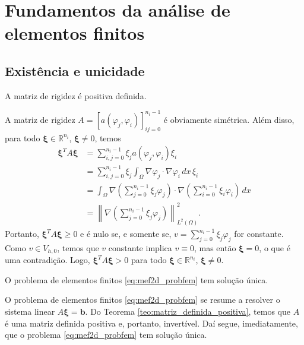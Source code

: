 \section{Fundamentos da análise de elementos finitos}\label{cap_mef2d_sec_funanlef}
\badgeRevisar

\subsection{Existência e unicidade}
\badgeRevisar

\begin{teo}\label{teo:matriz_definida_positiva}
  A matriz de rigidez é positiva definida.
\end{teo}
\begin{dem}
  A matriz de rigidez $A = [a(\varphi_j,\varphi_i)]_{ij=0}^{n_i-1}$ é obviamente simétrica. Além disso, para todo $\pmb{\xi}\in\mathbb{R}^{n_i}$, $\pmb{\xi}\neq 0$, temos
  \begin{align}
    \pmb{\xi}^TA\pmb{\xi} &= \sum_{i,j=0}^{n_i-1} \xi_ja(\varphi_j,\varphi_i)\xi_i\\
    &= \sum_{i,j=0}^{n_i-1}\xi_j\int_\Omega \nabla \varphi_j\cdot\nabla\varphi_i\,dx\,\xi_i\\
    &= \int_\Omega \nabla \left(\sum_{j=0}^{n_i-1}\xi_j\varphi_j\right)\cdot\nabla \left(\sum_{i=0}^{n_i-1}\xi_i\varphi_i\right)\,dx\\
    &= \left\|\nabla \left(\sum_{j=0}^{n_i-1}\xi_j\varphi_j\right) \right\|_{L^2(\Omega)}^2.
  \end{align}
  Portanto, $\pmb{\xi}^TA\pmb{\xi} \geq 0$ e é nulo se, e somente se, $v = \sum_{j=0}^{n_i-1}\xi_j\varphi_j$ for constante. Como $v\in V_{h,0}$, temos que $v$ constante implica $v\equiv 0$, mas então $\pmb{\xi}=0$, o que é uma contradição. Logo, $\pmb{\xi}^TA\pmb{\xi} > 0$ para todo $\pmb{\xi}\in\mathbb{R}^{n_i}$, $\pmb{\xi}\neq 0$.
\end{dem}

\begin{teo}
  O problema de elementos finitos \eqref{eq:mef2d_probfem} tem solução única.
\end{teo}
\begin{dem}
  O problema de elementos finitos \eqref{eq:mef2d_probfem} se resume a resolver o sistema linear $A\pmb{\xi} = \pmb{b}$. Do Teorema \ref{teo:matriz_definida_positiva}, temos que $A$ é uma matriz definida positiva e, portanto, invertível. Daí segue, imediatamente, que o problema \eqref{eq:mef2d_probfem} tem solução única.
\end{dem}

